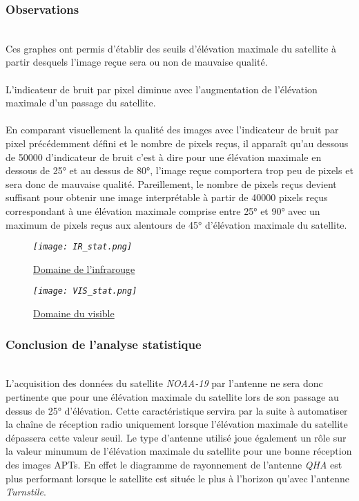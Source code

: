 \documentclass[12pt,fleqn]{book} %
\begin{document}
\subsubsection{Observations}
~\\Ces graphes ont permis d'établir des seuils d'élévation maximale du satellite à partir desquels l'image reçue sera ou non de mauvaise qualité. 
~\\\\L'indicateur de bruit par pixel diminue avec l'augmentation de l'élévation maximale d'un passage du satellite.
~\\\\En comparant visuellement la qualité des images avec l'indicateur de bruit par pixel précédemment défini et le nombre de pixels reçus, il apparaît qu'au dessous de 50000 d'indicateur de bruit c'est à dire pour une élévation maximale en dessous de 25° et au dessus de 80°, l'image reçue comportera trop peu de pixels et sera donc de mauvaise qualité. Pareillement, le nombre de pixels reçus devient suffisant pour obtenir une image interprétable à partir de 40000 pixels reçus correspondant à une élévation maximale comprise entre 25° et 90° avec un maximum de pixels reçus aux alentours de 45° d'élévation maximale du satellite.  
\begin{figure}[H]
	\centering
	\itshape
	\texttt{[image: IR\_stat.png]}
	\caption{\label{IR_stat} \underline{Domaine de l'infrarouge}}
\end{figure}
\begin{figure}[H]
	\centering
	\itshape
	\texttt{[image: VIS\_stat.png]}
	\caption{\label{VIS_stat} \underline{Domaine du visible}}
\end{figure}
\subsubsection{Conclusion de l'analyse statistique}
~\\L'acquisition des données du satellite \emph{NOAA-19} par l'antenne ne sera donc pertinente que pour une élévation maximale du satellite lors de son passage au dessus de 25° d'élévation. Cette caractéristique servira par la suite à automatiser la chaîne de réception radio uniquement lorsque l'élévation maximale du satellite dépassera cette valeur seuil.
Le type d'antenne utilisé joue également un rôle sur la valeur minumum de l'élévation maximale du satellite pour une bonne réception des images APTs. En effet le diagramme de rayonnement de l'antenne \emph{QHA} est plus performant lorsque le satellite est située le plus à l'horizon qu'avec l'antenne \emph{Turnstile}.
\end{document}
